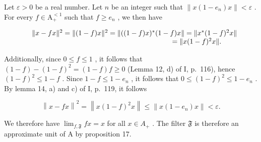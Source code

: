 Let \(\varepsilon > 0\) be a real number. Let \(n\) be an integer such that \(\|x(1 - e_n)x\| < \varepsilon\) . For every \(f \in \mathrm{A}_+^{<1}\) such that \(f \geqslant e_n\) , we then have

\[
\begin{array}{r l} & {\| x - f x \| ^ {2} = \| (1 - f) x \| ^ {2} = \| ((1 - f) x) ^ {*} (1 - f) x \| = \| x ^ {*} (1 - f) ^ {2} x \|} \\ & {\qquad \qquad \qquad \qquad \qquad \qquad \qquad \qquad \qquad \qquad = \| x (1 - f) ^ {2} x \|.} \end{array}
\]

Additionally, since \(0 \leqslant f \leqslant 1\) , it follows that \((1-f)-(1-f)^{2} = (1-f)f \geqslant 0\) (Lemma 12, d) of I, p.~116), hence \((1-f)^{2} \leqslant 1-f\) . Since \(1-f \leqslant 1-e_{n}\) , it follows that \(0 \leqslant (1-f)^{2} \leqslant 1-e_{n}\) . By lemma 14, a) and c) of I, p.~119, it follows

\[
\left\| x - f x \right\| ^ {2} = \left\| x (1 - f) ^ {2} x \right\| \leqslant \left\| x (1 - e _ {n}) x \right\| <   \varepsilon .
\]

We therefore have \(\lim_{f,\mathfrak{F}}fx = x\) for all \(x \in A_{+}\) . The filter \(\mathfrak{F}\) is therefore an approximate unit of A by proposition 17.

